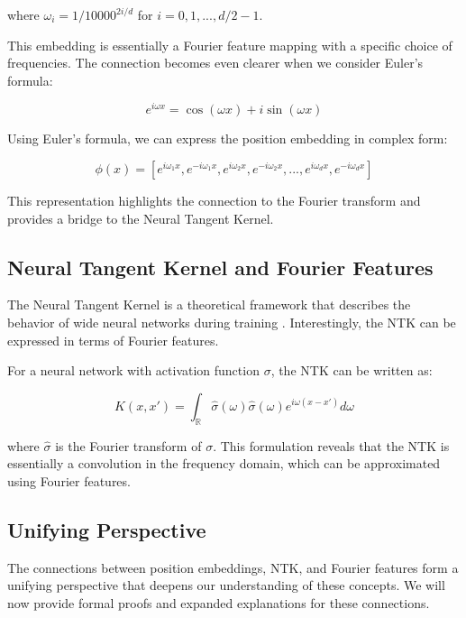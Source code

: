 \documentclass{article}
\begin{document}
where $\omega_i = 1/10000^{2i/d}$ for $i = 0, 1, ..., d/2 - 1$.

This embedding is essentially a Fourier feature mapping with a specific choice of frequencies. The connection becomes even clearer when we consider Euler's formula:

\begin{equation}
    e^{i\omega x} = \cos(\omega x) + i\sin(\omega x)
\end{equation}

Using Euler's formula, we can express the position embedding in complex form:

\begin{equation}
    \phi(x) = [e^{i\omega_1 x}, e^{-i\omega_1 x}, e^{i\omega_2 x}, e^{-i\omega_2 x}, ..., e^{i\omega_d x}, e^{-i\omega_d x}]
\end{equation}

This representation highlights the connection to the Fourier transform and provides a bridge to the Neural Tangent Kernel.

\subsection{Neural Tangent Kernel and Fourier Features}

The Neural Tangent Kernel is a theoretical framework that describes the behavior of wide neural networks during training \citep{Jacot2018}. Interestingly, the NTK can be expressed in terms of Fourier features.

For a neural network with activation function $\sigma$, the NTK can be written as:

\begin{equation}
    K(x, x') = \int_{\mathbb{R}} \hat{\sigma}(\omega) \hat{\sigma}(\omega) e^{i\omega(x-x')} d\omega
\end{equation}

where $\hat{\sigma}$ is the Fourier transform of $\sigma$. This formulation reveals that the NTK is essentially a convolution in the frequency domain, which can be approximated using Fourier features.

\subsection{Unifying Perspective}

The connections between position embeddings, NTK, and Fourier features form a unifying perspective that deepens our understanding of these concepts. We will now provide formal proofs and expanded explanations for these connections.
\end{document}
